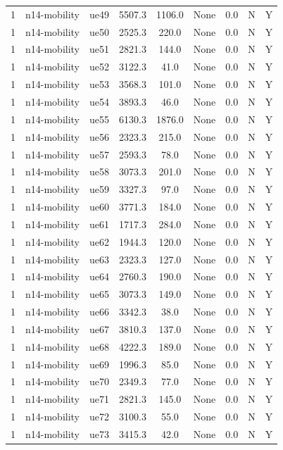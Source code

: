 \begin{table}[ht]
\begin{tabular}{|c|c|c|c|c|c|c|c|c|}
1 & n14-mobility & ue49 & 5507.3 & 1106.0 & None & 0.0 & N & Y \\
1 & n14-mobility & ue50 & 2525.3 & 220.0 & None & 0.0 & N & Y \\
1 & n14-mobility & ue51 & 2821.3 & 144.0 & None & 0.0 & N & Y \\
1 & n14-mobility & ue52 & 3122.3 & 41.0 & None & 0.0 & N & Y \\
1 & n14-mobility & ue53 & 3568.3 & 101.0 & None & 0.0 & N & Y \\
1 & n14-mobility & ue54 & 3893.3 & 46.0 & None & 0.0 & N & Y \\
1 & n14-mobility & ue55 & 6130.3 & 1876.0 & None & 0.0 & N & Y \\
1 & n14-mobility & ue56 & 2323.3 & 215.0 & None & 0.0 & N & Y \\
1 & n14-mobility & ue57 & 2593.3 & 78.0 & None & 0.0 & N & Y \\
1 & n14-mobility & ue58 & 3073.3 & 201.0 & None & 0.0 & N & Y \\
1 & n14-mobility & ue59 & 3327.3 & 97.0 & None & 0.0 & N & Y \\
1 & n14-mobility & ue60 & 3771.3 & 184.0 & None & 0.0 & N & Y \\
1 & n14-mobility & ue61 & 1717.3 & 284.0 & None & 0.0 & N & Y \\
1 & n14-mobility & ue62 & 1944.3 & 120.0 & None & 0.0 & N & Y \\
1 & n14-mobility & ue63 & 2323.3 & 127.0 & None & 0.0 & N & Y \\
1 & n14-mobility & ue64 & 2760.3 & 190.0 & None & 0.0 & N & Y \\
1 & n14-mobility & ue65 & 3073.3 & 149.0 & None & 0.0 & N & Y \\
1 & n14-mobility & ue66 & 3342.3 & 38.0 & None & 0.0 & N & Y \\
1 & n14-mobility & ue67 & 3810.3 & 137.0 & None & 0.0 & N & Y \\
1 & n14-mobility & ue68 & 4222.3 & 189.0 & None & 0.0 & N & Y \\
1 & n14-mobility & ue69 & 1996.3 & 85.0 & None & 0.0 & N & Y \\
1 & n14-mobility & ue70 & 2349.3 & 77.0 & None & 0.0 & N & Y \\
1 & n14-mobility & ue71 & 2821.3 & 145.0 & None & 0.0 & N & Y \\
1 & n14-mobility & ue72 & 3100.3 & 55.0 & None & 0.0 & N & Y \\
1 & n14-mobility & ue73 & 3415.3 & 42.0 & None & 0.0 & N & Y \\

\end{tabular}
\end{table}
